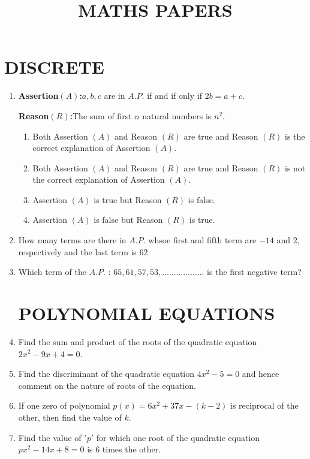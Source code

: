\documentclass[12pt,-letter paper]{article}
\title{\textbf{MATHS PAPERS}}
\providecommand{\brak}[1]{\ensuremath{\left(#1\right)}}
\begin{document}
\maketitle
\section*{DISCRETE}
\begin{enumerate}
\item
\textbf{Assertion$\brak{A}$:}$a,b,c$ are in $A.P.$ if and if only if $2b = a + c$.

\textbf{Reason$\brak{R}$:}The sum of first $n$ natural numbers is $n^2$.
\begin{enumerate}
\item Both Assertion $\brak{A}$ and Reason $\brak{R}$ are true and Reason $\brak{R}$ is the correct explanation of Assertion $\brak{A}$.
\item Both Assertion $\brak{A}$ and Reason $\brak{R}$ are true and Reason $\brak{R}$ is not the correct explanation of Assertion $\brak{A}$.
\item Assertion $\brak{A}$ is true but Reason $\brak{R}$ is false.
\item Assertion $\brak{A}$ is false but Reason $\brak{R}$ is true.
\end{enumerate}
\item
How many terms are there in $A.P.$ whsoe first and fifth term are $-14$ and $2$, respectively and the last term is $62$.
\item
Which term of the $A.P.$ : $65,61,57,53, ..................$ is the first negative term?
\section*{POLYNOMIAL EQUATIONS}
\item
Find the sum and product of the roots of the quadratic equation $2x^2-9x+4=0$.

\item
Find the discriminant of the quadratic equation $4x^2-5=0$ and hence comment on the nature of roots of the equation.
\item
If one zero of polynomial $p$\brak{x}$=6x^2+37x-\brak{k-2}$ is reciprocal of the other, then  find the value of $k$.
\item
Find the value of $'p'$ for which one root of the quadratic equation $px^2-14x+8=0$ is $6$ times the other.

\end{enumerate}
\end{document}
